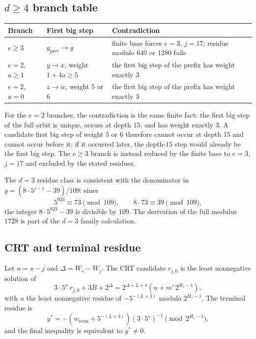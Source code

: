 \subsection{$d\ge4$ branch table}

\begin{center}
\small
\begin{tabular}{@{}p{}p{}p{}@{}}
\toprule
Branch & First big step & Contradiction \\
\midrule
$e\ge3$ & $g_{\mathrm{prev}}\to g$ &
  finite base forces $e=3$, $j=17$; residue modulo $640$ or $1280$
  fails \\
$e=2$, $a\ge1$ & $y\to x$, weight $1+4a\ge5$ &
  the first big step of the prefix has weight exactly $3$ \\
$e=2$, $a=0$ & $z\to w$, weight $5$ or $6$ &
  the first big step of the prefix has weight exactly $3$ \\
\bottomrule
\end{tabular}
\end{center}

For the $e=2$ branches, the contradiction is the same finite fact:
the first big step of the full orbit is unique, occurs at depth $15$,
and has weight exactly $3$.  A candidate first big step of weight $5$
or $6$ therefore cannot occur at depth $15$ and cannot occur before
it; if it occurred later, the depth-$15$ step would already be the
first big step.  The $e\ge3$ branch is instead reduced by the finite
base to $e=3$, $j=17$ and excluded by the stated residues.

The $d=3$ residue class is consistent with the denominator in
$g=(8\cdot5^{j-1}-39)/109$: since
\begin{equation*}
  5^{923}\equiv73\pmod{109},
\qquad
  8\cdot73\equiv39\pmod{109},
\end{equation*}
the integer $8\cdot5^{923}-39$ is divisible by $109$.  The derivation
of the full modulus $1728$ is part of the $d=3$ family calculation.

\subsection{CRT and terminal residue}

Let $n=s-j$ and $\Delta=W_s-W_j$.  The CRT candidate $r_{j,0}$ is the
least nonnegative solution of
\begin{equation*}
  3\cdot5^n\,r_{j,0}+3B+2^\Delta
    =2^{\Delta+L+4}\left(u+m'\,2^{H_s-1}\right),
\end{equation*}
with $u$ the least nonnegative residue of
$-5^{-(L+3)}$ modulo $2^{H_s-1}$.  The terminal residue is
\begin{equation*}
  y^*=-\left(w_{\mathrm{term}}+5^{-(L+3)}\right)
  \left(3\cdot5^s\right)^{-1}\pmod{2^{H_s-1}},
\end{equation*}
and the final inequality is equivalent to $y^*\ne0$.

